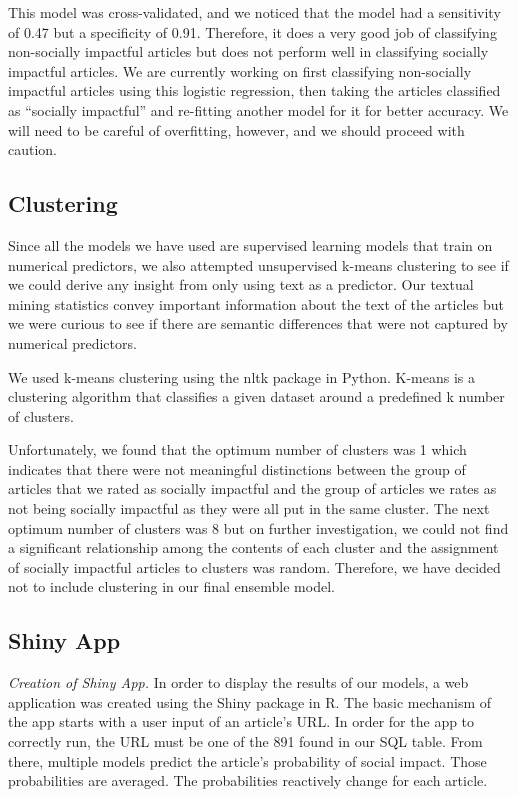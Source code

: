 \documentclass[10pt,letterpaper]{article}
\begin{document}
This model was cross-validated, and we noticed that the model had a
sensitivity of 0.47 but a specificity of 0.91. Therefore, it does a very
good job of classifying non-socially impactful articles but does not
perform well in classifying socially impactful articles. We are
currently working on first classifying non-socially impactful articles
using this logistic regression, then taking the articles classified as
``socially impactful'' and re-fitting another model for it for better
accuracy. We will need to be careful of overfitting, however, and we
should proceed with caution.

\subsection{Clustering}\label{clustering}

Since all the models we have used are supervised learning models that
train on numerical predictors, we also attempted unsupervised k-means
clustering to see if we could derive any insight from only using text as
a predictor. Our textual mining statistics convey important information
about the text of the articles but we were curious to see if there are
semantic differences that were not captured by numerical predictors.

We used k-means clustering using the nltk package in Python. K-means is
a clustering algorithm that classifies a given dataset around a
predefined k number of clusters.

Unfortunately, we found that the optimum number of clusters was 1 which
indicates that there were not meaningful distinctions between the group
of articles that we rated as socially impactful and the group of
articles we rates as not being socially impactful as they were all put
in the same cluster. The next optimum number of clusters was 8 but on
further investigation, we could not find a significant relationship
among the contents of each cluster and the assignment of socially
impactful articles to clusters was random. Therefore, we have decided
not to include clustering in our final ensemble model.

\subsection{Shiny App}\label{shiny-app}

\emph{Creation of Shiny App.} In order to display the results of our
models, a web application was created using the Shiny package in R. The
basic mechanism of the app starts with a user input of an article's URL.
In order for the app to correctly run, the URL must be one of the 891
found in our SQL table. From there, multiple models predict the
article's probability of social impact. Those probabilities are
averaged. The probabilities reactively change for each article.
\end{document}
